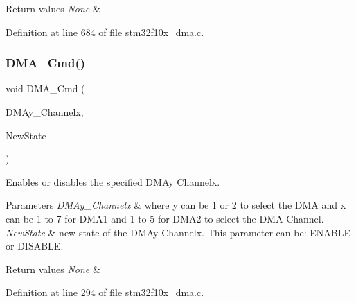 \begin{DoxyRetVals}{Return values}
{\em None} & \\
\hline
\end{DoxyRetVals}


Definition at line 684 of file stm32f10x\+\_\+dma.\+c.

\mbox{\label{group___d_m_a___exported___functions_ga8e7cb6b9ae5f142e2961df879cdaba65}} 
\subsubsection{\texorpdfstring{D\+M\+A\+\_\+\+Cmd()}{DMA\_Cmd()}}
{\footnotesize\ttfamily void D\+M\+A\+\_\+\+Cmd (\begin{DoxyParamCaption}\item[{\hyperlink{struct_d_m_a___channel___type_def}{D\+M\+A\+\_\+\+Channel\+\_\+\+Type\+Def} $\ast$}]{D\+M\+Ay\+\_\+\+Channelx,  }\item[{\hyperlink{group___exported__types_gac9a7e9a35d2513ec15c3b537aaa4fba1}{Functional\+State}}]{New\+State }\end{DoxyParamCaption})}



Enables or disables the specified D\+M\+Ay Channelx. 


\begin{DoxyParams}{Parameters}
{\em D\+M\+Ay\+\_\+\+Channelx} & where y can be 1 or 2 to select the D\+MA and x can be 1 to 7 for D\+M\+A1 and 1 to 5 for D\+M\+A2 to select the D\+MA Channel. \\
\hline
{\em New\+State} & new state of the D\+M\+Ay Channelx. This parameter can be\+: E\+N\+A\+B\+LE or D\+I\+S\+A\+B\+LE. \\
\hline
\end{DoxyParams}

\begin{DoxyRetVals}{Return values}
{\em None} & \\
\hline
\end{DoxyRetVals}


Definition at line 294 of file stm32f10x\+\_\+dma.\+c.

\mbox{\label{group___d_m_a___exported___functions_ga21ca0d50b13e502db5ab5feb484f9ece}} 
